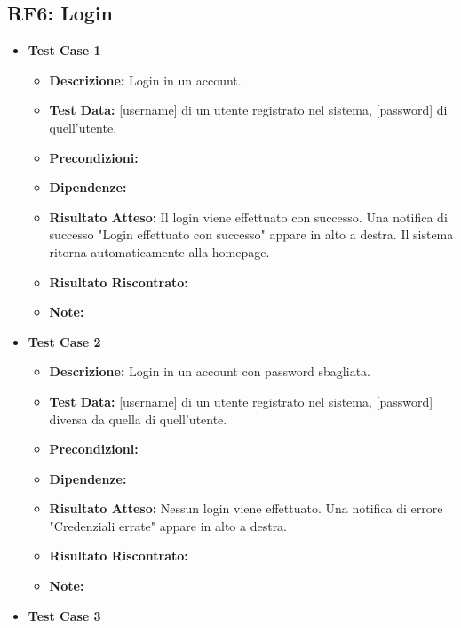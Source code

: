     \subsection{RF6: Login}
        \begin{itemize}
            \item \textbf{Test Case 1}
                \begin{itemize}
                    \item \textbf{Descrizione:} Login in un account.
                    \item \textbf{Test Data:} [username] di un utente registrato nel sistema, [password] di quell'utente.
                    \item \textbf{Precondizioni:} 
                    \item \textbf{Dipendenze:}
                    \item \textbf{Risultato Atteso:} Il login viene effettuato con successo. Una notifica di successo "Login effettuato con successo" appare in alto a destra. Il sistema ritorna automaticamente alla homepage.
                    \item \textbf{Risultato Riscontrato:}
                    \item \textbf{Note:}
                \end{itemize}
            \item \textbf{Test Case 2}
                \begin{itemize}
                    \item \textbf{Descrizione:} Login in un account con password sbagliata.
                    \item \textbf{Test Data:} [username] di un utente registrato nel sistema, [password] diversa da quella di quell'utente.
                    \item \textbf{Precondizioni:} 
                    \item \textbf{Dipendenze:}
                    \item \textbf{Risultato Atteso:} Nessun login viene effettuato. Una notifica di errore "Credenziali errate" appare in alto a destra.
                    \item \textbf{Risultato Riscontrato:}
                    \item \textbf{Note:}
                \end{itemize}
            \item \textbf{Test Case 3}
                \begin{itemize}

\end{itemize}
\end{itemize}
